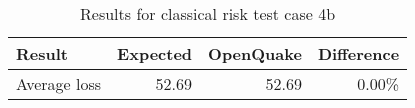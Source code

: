 \begin{table}[htbp]

\centering
\begin{tabular}{ l r r r }

\hline
\rowcolor{anti-flashwhite}
\bf{Result} & \bf{Expected} & \bf{OpenQuake} & \bf{Difference}\\
\hline
Average loss & 52.69 & 52.69 & 0.00\% \\
\hline
\end{tabular}

\caption{Results for classical risk test case 4b}
\label{tab:result-cr-4b}
\end{table}